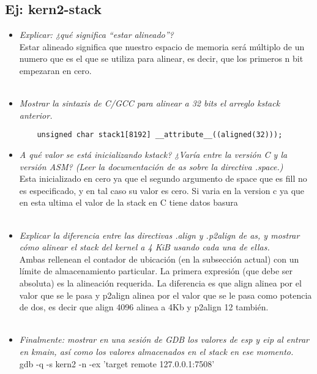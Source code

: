 \documentclass[a4paper, 12pt]{article}
\begin{document}
		\subsection{Ej: kern2-stack}
		\begin{itemize}
			\item \textit{Explicar: ¿qué significa “estar alineado”?\\}
		Estar alineado significa que nuestro espacio de memoria será
		múltiplo de un numero que es el que se utiliza para alinear, es decir,
		que los primeros n bit empezaran en cero.\\\\
			\item \textit{Mostrar la sintaxis de C/GCC para alinear a 32 bits
			el arreglo kstack anterior.\\}
\begin{lstlisting}
	unsigned char stack1[8192] __attribute__((aligned(32)));
\end{lstlisting}
			\item \textit{A qué valor se está inicializando kstack?
			¿Varía entre la versión C y la versión ASM? (Leer la documentación
			de as sobre la directiva .space.)\\}
		Esta inicializado en cero ya que el segundo argumento de space que es
		fill no es especificado, y en tal caso su valor es cero. Si varia en la
		version c ya que en esta ultima el valor de la stack en C tiene datos
		basura\\\\
			\item \textit{Explicar la diferencia entre las directivas .align y
			.p2align de as, y mostrar cómo alinear el stack del kernel a 4 KiB
			usando cada una de ellas.\\}
		Ambas rellenean el contador de ubicación (en la subsección actual) con
		un límite de almacenamiento particular. La primera expresión
		(que debe ser absoluta) es la alineación requerida. La diferencia es que
		align alinea por el valor que se le pasa y p2align alinea por el valor
		que se le pasa como potencia de dos, es decir que align 4096 alinea a
		4Kb y p2align 12 también.\\\\
			\item \textit{Finalmente: mostrar en una sesión de GDB los valores
			de esp y eip al entrar en kmain, así como los valores almacenados
			en el stack en ese momento.\\}
			gdb -q -s kern2 -n -ex 'target remote 127.0.0.1:7508'\\

\end{itemize}
\end{document}
